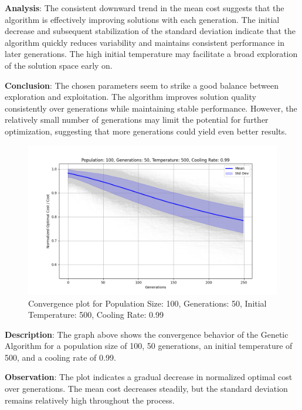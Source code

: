 \documentclass{article}
\begin{document}
    \textbf{Analysis}: The consistent downward trend in the mean cost suggests that the algorithm is effectively improving solutions with each generation. The initial decrease and subsequent stabilization of the standard deviation indicate that the algorithm quickly reduces variability and maintains consistent performance in later generations. The high initial temperature may facilitate a broad exploration of the solution space early on.

    \textbf{Conclusion}: The chosen parameters seem to strike a good balance between exploration and exploitation. The algorithm improves solution quality consistently over generations while maintaining stable performance. However, the relatively small number of generations may limit the potential for further optimization, suggesting that more generations could yield even better results.


    \begin{figure}[H]
        \centering
        \includegraphics[width=\textwidth]{genetic_simulated_annealing_hybrid/Population_100_Generations_50_Temperature_500_CoolingRate_0.99}
        \caption{Convergence plot for Population Size: 100, Generations: 50, Initial Temperature: 500, Cooling Rate: 0.99}
        \label{fig:pop100_gen50_temp500_cr0.99}
    \end{figure}

    \textbf{Description}: The graph above shows the convergence behavior of the Genetic Algorithm for a population size of 100, 50 generations, an initial temperature of 500, and a cooling rate of 0.99.

    \textbf{Observation}: The plot indicates a gradual decrease in normalized optimal cost over generations. The mean cost decreases steadily, but the standard deviation remains relatively high throughout the process.
\end{document}
